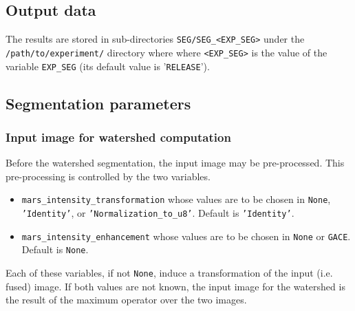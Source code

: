 \subsection{Output data}

The results are stored in sub-directories
\texttt{SEG/SEG\_<EXP\_SEG>} under the
\texttt{/path/to/experiment/} directory where where \texttt{<EXP\_SEG>} is the value of the variable \texttt{EXP\_SEG} (its
default value is '\texttt{RELEASE}'). 


\subsection{Segmentation parameters}


\subsubsection{Input image for watershed computation}
\label{sec:cli:mars:input:watershed}

Before the watershed segmentation, the input image may be pre-processed. This pre-processing is controlled by the two variables.
\begin{itemize}
\itemsep -1ex
\item \texttt{mars\_intensity\_transformation} whose values are to be chosen in \texttt{None}, \texttt{'Identity'}, or \texttt{'Normalization\_to\_u8'}. Default is \texttt{'Identity'}.
\item \texttt{mars\_intensity\_enhancement} whose values are to be chosen in \texttt{None} or \texttt{GACE}. Default is \texttt{None}.
\end{itemize}
Each of these variables, if not \texttt{None}, induce a transformation of the input (i.e. fused) image. If both values are not known, the input image for the watershed is the result of the maximum operator over the two images.

